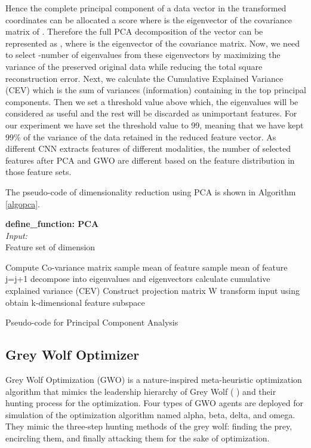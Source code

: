 \documentclass{llncs}
\begin{document}
Hence the  complete principal component of a data vector  in the transformed coordinates can be allocated a score  where  is the  eigenvector of the covariance matrix of . Therefore the full PCA decomposition of the vector  can be represented as , where  is the eigenvector of the covariance matrix. Now, we need to select -number of eigenvalues from these  eigenvectors by maximizing the variance of the preserved original data while reducing the total square reconstruction error. Next, we calculate the Cumulative Explained Variance (CEV) which is the sum of variances (information) containing in the top  principal components. Then we set a threshold value above which, the eigenvalues will be considered as useful and the rest will be discarded as unimportant features. For our experiment we have set the threshold value to 99, meaning that we have kept 99\% of the variance of the data retained in the reduced feature vector. As different CNN extracts features of different modalities, the number of selected features after PCA and GWO are different based on the feature distribution in those feature sets. 

The pseudo-code of dimensionality reduction using PCA is shown in Algorithm \ref{algopca}.

\begin{algorithm}
    {\small
    \textbf{define\_function: PCA}\\
    {\em Input:}\\
    Feature set  of dimension 
    \begin{algorithmic}
        \STATE Compute Co-variance matrix 
        \STATE{}
            \STATE{}
               \STATE  sample mean of feature  
               \STATE  sample mean of feature 
               \STATE 
               \STATE j=j+1
            \ENDWHILE
            \STATE 
        \ENDWHILE
        \STATE decompose  into eigenvalues and eigenvectors
        \STATE calculate cumulative explained variance (CEV)
        \STATE{}
            \STATE Construct projection matrix W
        \ENDIF
        \STATE transform input  using 
        \STATE obtain k-dimensional feature subspace 
        
    \end{algorithmic}
    }
\caption{Pseudo-code for Principal Component Analysis}
\label{algopca}
\end{algorithm}
\subsection{Grey Wolf Optimizer}
Grey Wolf Optimization (GWO) \cite{mirjalili2014grey} is a nature-inspired meta-heuristic optimization algorithm that mimics the leadership hierarchy of Grey Wolf ( ) and their hunting process for the optimization. Four types of GWO agents are deployed for simulation of the optimization algorithm named alpha, beta, delta, and omega. They mimic the three-step hunting methods of the grey wolf: finding the prey, encircling them, and finally attacking them for the sake of optimization. 
\end{document}
